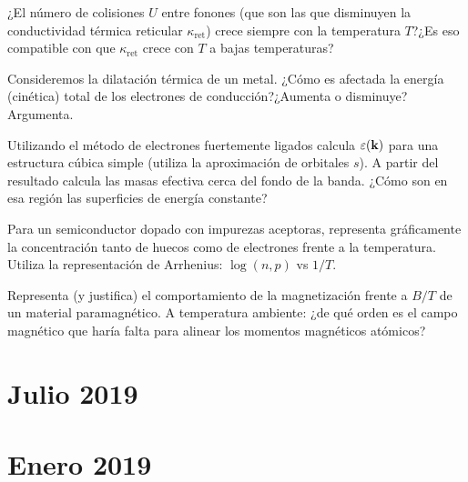\begin{ejercicio}
	¿El número de colisiones $U$ entre fonones (que son las que disminuyen la conductividad térmica reticular $\kappa_{\text{ret}}$) crece siempre con la temperatura $T$?¿Es eso compatible con que $\kappa_{\text{ret}}$ crece con $T$ a bajas temperaturas?
\end{ejercicio}

\begin{ejercicio}
	Consideremos la dilatación térmica de un metal. ¿Cómo es afectada la energía (cinética) total de los electrones de conducción?¿Aumenta o disminuye? Argumenta.
\end{ejercicio}

\begin{ejercicio}
	Utilizando el método de electrones fuertemente ligados calcula $\varepsilon(\mathbf{k})$ para una estructura cúbica simple (utiliza la aproximación de orbitales $s$). A partir del resultado calcula las masas efectiva cerca del fondo de la banda. ¿Cómo son en esa región las superficies de energía constante?
\end{ejercicio}
\begin{ejercicio}
	Para un semiconductor dopado con impurezas aceptoras, representa gráficamente la concentración tanto de huecos como de electrones frente a la temperatura. Utiliza la representación de Arrhenius: $\log (n,p) $ vs $1/T$.
\end{ejercicio}

\begin{ejercicio}
	Representa (y justifica) el comportamiento de la magnetización frente a $B/T$ de un material paramagnético. A temperatura ambiente: ¿de qué orden es el campo magnético que haría falta para alinear los momentos magnéticos atómicos?
\end{ejercicio}

\newpage


\section*{Julio 2019}
\setcounter{section}{4} %

\newpage

\section*{Enero 2019}
\setcounter{section}{5} %


